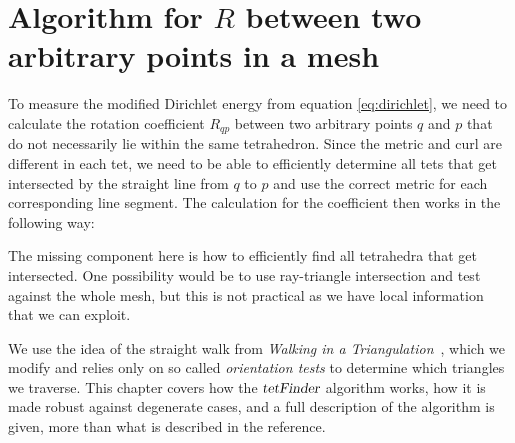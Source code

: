 \documentclass[../thesis.tex]{subfiles}
\begin{document}
\newcommand{\str}[1]{\textsc{#1}}
\newcommand{\var}[1]{\textit{#1}}


\chapter{Algorithm for $R$ between two arbitrary points in a mesh}
\label{ch:algorithm}
To measure the modified Dirichlet energy from equation \ref{eq:dirichlet}, we need to calculate the rotation coefficient $R_{qp}$
between two arbitrary points $q$ and $p$ that do not necessarily lie within the same 
tetrahedron. Since the metric and curl are different in each tet, we need to be
able to efficiently determine all tets that get intersected by the straight
line from $q$ to $p$ and use the correct metric for each corresponding
line segment.
The calculation for the coefficient then works in the following way:

The missing component here is how to efficiently find all tetrahedra
that get intersected. One possibility would be to use ray-triangle intersection and
test against the whole mesh, but this is not practical as we have local information
that we can exploit.

We use the idea of the straight walk from \emph{Walking in a Triangulation}~\cite{Devillers}, which we modify and relies only on
so called \emph{orientation tests} to determine which triangles we traverse.
This chapter covers how the $\textsl{tetFinder}$ algorithm works, how it is made robust
against degenerate cases,
and a full description of the algorithm is given, more than what is described in the reference.
\end{document}
